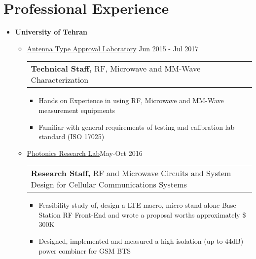 \documentclass[a4paper,10pt]{article} %
\begin{document}
\color{blue}
\color{blue}
\section{Professional Experience}
\color{Black}
\begin{itemize}
	 \item \textbf{University of Tehran} 
	 \begin{itemize}
	 	\item 
	 	\href{http://antennalab.ut.ac.ir/}{Antenna Type Approval Laboratory} \hfill Jun 2015 - Jul 2017\\
	 	\begin{tabular}{ll}
	 		{\bf Technical Staff, } RF, Microwave and MM-Wave Characterization & \\
	 	\end{tabular}
	 	\begin{itemize}
	 		\item
	 		Hands on Experience in using RF, Microwave and MM-Wave measurement equipments 
	 		
	 		\item 
	 		Familiar with general requirements of testing and calibration lab standard  (ISO 17025)\\
	 		
	 	\end{itemize}
	 	\item \href{http://prl.ut.ac.ir/}{Photonics Research Lab}\hfill  May-Oct 2016  \\
	 	\begin{tabular}{lr}
	 		{\bf Research Staff, } RF and Microwave Circuits and System Design for Cellular Communications Systems &\\	
	 	\end{tabular}
	 	\begin{itemize}
	 		\item
	 		Feasibility study of, design a LTE macro, micro stand alone Base Station RF Front-End and wrote a proposal worths approximately \$ 300K	
	 		\item
	 		Designed, implemented and measured a high isolation (up to 44dB) power combiner for GSM BTS\\
	 		

\end{itemize}
\end{itemize}
\end{itemize}
\end{document}
